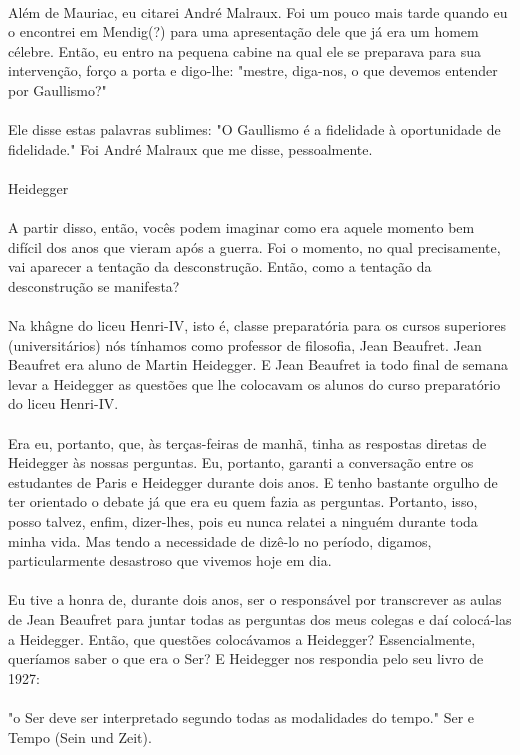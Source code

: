 \documentclass[10pt,a4paper]{book}
\begin{document}
	\\
	Além de Mauriac, eu citarei André Malraux. Foi um pouco mais tarde quando eu o encontrei em Mendig(?) para uma apresentação dele que já era um homem célebre. Então, eu entro na pequena cabine na qual ele se preparava para sua intervenção, forço a porta e digo-lhe: "mestre, diga-nos, o que devemos entender por Gaullismo?"\\
	\\
	Ele disse estas palavras sublimes: "O Gaullismo é a fidelidade à oportunidade de fidelidade." Foi André Malraux que me disse, pessoalmente.\\
	\\
	Heidegger\\
	\\
	A partir disso, então, vocês podem imaginar como era aquele momento bem difícil dos anos que vieram após a guerra. Foi o momento, no qual precisamente, vai aparecer a tentação da desconstrução. Então, como a tentação da desconstrução se manifesta?\\
	\\
	Na khâgne do liceu Henri-IV, isto é, classe preparatória para os cursos superiores (universitários) nós tínhamos como professor de filosofia, Jean Beaufret. Jean Beaufret era aluno de Martin Heidegger. E Jean Beaufret ia todo final de semana levar a Heidegger as questões que lhe colocavam os alunos do curso preparatório do liceu Henri-IV.\\
	\\
	Era eu, portanto, que, às terças-feiras de manhã, tinha as respostas diretas de Heidegger às nossas perguntas. Eu, portanto, garanti a conversação entre os estudantes de Paris e Heidegger durante dois anos. E tenho bastante orgulho de ter orientado o debate já que era eu quem fazia as perguntas. Portanto, isso, posso talvez, enfim, dizer-lhes, pois eu nunca relatei a ninguém durante toda minha vida. Mas tendo a necessidade de dizê-lo no período, digamos, particularmente desastroso que vivemos hoje em dia.\\
	\\
	Eu tive a honra de, durante dois anos, ser o responsável por transcrever as aulas de Jean Beaufret para juntar todas as perguntas dos meus colegas e daí colocá-las a Heidegger. Então, que questões colocávamos a Heidegger? Essencialmente, queríamos saber o que era o Ser? E Heidegger nos respondia pelo seu livro de 1927: \\
	\\
	"o Ser deve ser interpretado segundo todas as modalidades do tempo." Ser e Tempo (Sein und Zeit).\\
\end{document}
